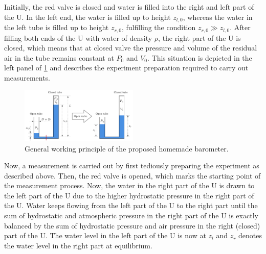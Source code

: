 \documentclass[a4paper,11pt, twocolumn]{article}
\begin{document}
Initially, the red valve is closed and water is filled into the right and left part of the U. In the left end, the water is filled up to height $z_{l,0}$, whereas the water in the left tube is filled up to height $z_{r,0}$, fulfilling the condition $z_{r,0} \gg z_{l,0}$. After filling both ends of the U with water of density $\rho$, the right part of the U is closed, which means that at closed valve the pressure and volume of the residual air in the tube remains constant at $P_0$ and $V_0$. This situation is depicted in the left panel of \cref{fig:barometer_principle} and describes the experiment preparation required to carry out measurements.
\begin{figure}[h]
	\centering
	\includegraphics[width=0.5\textwidth]{figures/barometer_principle.pdf}
	\caption{General working principle of the proposed homemade barometer.}
	\label{fig:barometer_principle}
\end{figure}

Now, a measurement is carried out by first tediously preparing the experiment as described above. Then, the red valve is opened, which marks the starting point of the measurement process. Now, the water in the right part of the U is drawn to the left part of the U due to the higher hydrostatic pressure in the right part of the U. Water keeps flowing from the left part of the U to the right part until the sum of hydrostatic and atmospheric pressure in the right part of the U is exactly balanced by the sum of hydrostatic pressure and air pressure in the right (closed) part of the U. The water level in the left part of the U is now at $z_l$ and $z_r$ denotes the water level in the right part at equilibrium.
\end{document}

